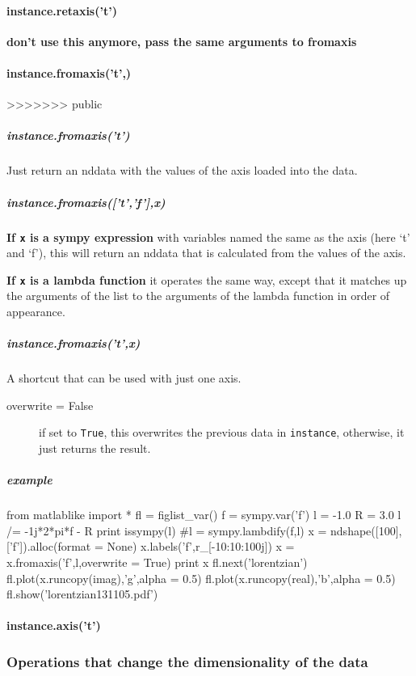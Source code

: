 \paragraph{instance.retaxis('t')}
\textbf{don't use this anymore, pass the same arguments to fromaxis}
\paragraph{instance.fromaxis('t',\cdots)}
>>>>>>> public
\subparagraph{instance.fromaxis('t')}
Just return an nddata with the values of the axis loaded into the data.
\subparagraph{instance.fromaxis(['t','f'],x)}
\textbf{If \texttt{x} is a sympy expression} with variables named the same as the axis (here `t' and `f'), this will return an nddata that is calculated from the values of the axis.

\textbf{If \texttt{x} is a lambda function} it operates the same way, except that it matches up the arguments of the list to the arguments of the lambda function in order of appearance.

\subparagraph{instance.fromaxis('t',x)}
A shortcut that can be used with just one axis.

\begin{mykwargs}
    \begin{description}
        \item[overwrite = False] 
            if set to \texttt{True}, this overwrites the previous data in \texttt{instance}, otherwise, it just returns the result.
    \end{description}
\end{mykwargs}

\subparagraph{example}

\begin{python}
from matlablike import *
fl = figlist_var()
f = sympy.var('f')
l = -1.0
R = 3.0
l /= -1j*2*pi*f - R
print issympy(l)
#l = sympy.lambdify(f,l)
x = ndshape([100],['f']).alloc(format = None)
x.labels('f',r_[-10:10:100j])
x = x.fromaxis('f',l,overwrite = True)
print x
fl.next('lorentzian')
fl.plot(x.runcopy(imag),'g',alpha = 0.5)
fl.plot(x.runcopy(real),'b',alpha = 0.5)
fl.show('lorentzian131105.pdf')
\end{python}

\paragraph{instance.axis('t')}
\subsubsection{Operations that change the dimensionality of the data}

